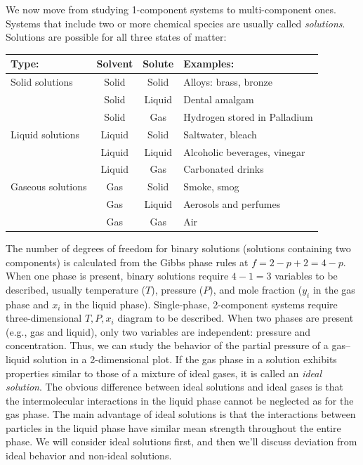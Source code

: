 \documentclass[
  9pt,
]{extbook}
\theoremstyle{definition}
\theoremstyle{definition}
\theoremstyle{definition}
\theoremstyle{definition}
\theoremstyle{remark}
\begin{document}
We now move from studying 1-component systems to multi-component ones. Systems that include two or more chemical species are usually called \emph{solutions}. Solutions are possible for all three states of matter:

\scriptsize

\begin{longtable}[]{@{}lccl@{}}
\toprule\noalign{}
Type: & Solvent & Solute & Examples: \\
\midrule\noalign{}
\endhead
\bottomrule\noalign{}
\endlastfoot
Solid solutions & Solid & Solid & Alloys: brass, bronze \\
& Solid & Liquid & Dental amalgam \\
& Solid & Gas & Hydrogen stored in Palladium \\
Liquid solutions & Liquid & Solid & Saltwater, bleach \\
& Liquid & Liquid & Alcoholic beverages, vinegar \\
& Liquid & Gas & Carbonated drinks \\
Gaseous solutions & Gas & Solid & Smoke, smog \\
& Gas & Liquid & Aerosols and perfumes \\
& Gas & Gas & Air \\
\end{longtable}

\normalsize

The number of degrees of freedom for binary solutions (solutions containing two components) is calculated from the Gibbs phase rules at \(f=2-p+2=4-p\). When one phase is present, binary solutions require \(4-1=3\) variables to be described, usually temperature (\(T\)), pressure (\(P\)), and mole fraction (\(y_i\) in the gas phase and \(x_i\) in the liquid phase). Single-phase, 2-component systems require three-dimensional \(T,P,x_i\) diagram to be described. When two phases are present (e.g., gas and liquid), only two variables are independent: pressure and concentration. Thus, we can study the behavior of the partial pressure of a gas--liquid solution in a 2-dimensional plot. If the gas phase in a solution exhibits properties similar to those of a mixture of ideal gases, it is called an \emph{ideal solution}. The obvious difference between ideal solutions and ideal gases is that the intermolecular interactions in the liquid phase cannot be neglected as for the gas phase. The main advantage of ideal solutions is that the interactions between particles in the liquid phase have similar mean strength throughout the entire phase. We will consider ideal solutions first, and then we'll discuss deviation from ideal behavior and non-ideal solutions.
\end{document}
